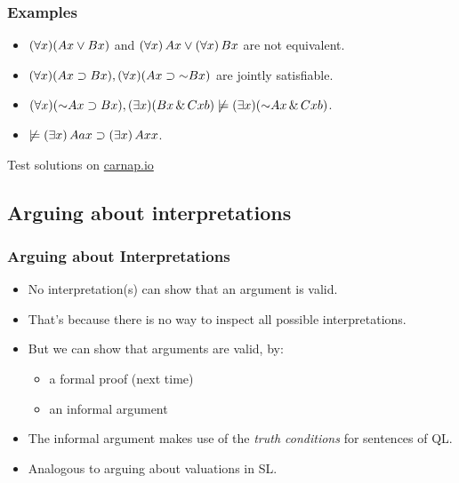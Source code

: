 \begin{frame}
\frametitle{Examples}

\begin{itemize}[<+->]
  \item $(\forall x)(Ax \vee Bx)$ and $(\forall x)\,Ax \vee (\forall x)\,Bx$ are not equivalent.
  \item  $\qt{\forall}{x}(A\qv{x} \eif B\qv{x}), \qt{\forall}{x}(A\qv{x} \eif \enot B\qv{x})$ are jointly satisfiable.
  \item $\qt{\forall}{x}(\enot A\qv{x} \eif B\qv{x}), \qt{\exists}{x}(B\qv{x} \eand C\qr{x}{b})
  \not\models \qt{\exists}{x}(\enot A\qv{x} \eand C\qr{x}{b})$.
  \item $\not\models (\exists x)\, Aax \supset (\exists x)\, Axx$.
\end{itemize}
Test solutions on \href{https://carnap.io/shared/rzach@ucalgary.ca/Practice\%20Problems\%20VI.md}{carnap.io}
\end{frame}

\subsection{Arguing about interpretations}

\begin{frame}
\frametitle{Arguing about Interpretations}

\begin{itemize}[<+->]
  \item No interpretation(s) can show that an argument is valid.
  \item That's because there is no way to inspect all possible interpretations.
  \item But we can show that arguments are valid, by:
  \begin{itemize}
    \item a formal proof (next time)
    \item an informal argument
  \end{itemize}
  \item The informal argument makes use of the \emph{truth conditions}
  for sentences of QL.
  \item Analogous to arguing about valuations in SL.
\end{itemize}

\end{frame}

